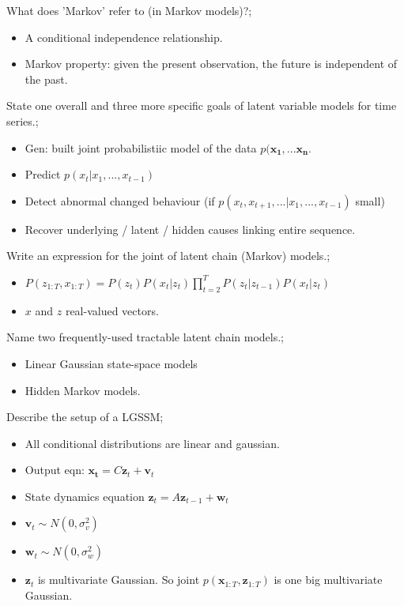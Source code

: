 \documentclass{article}
\begin{document}
What does 'Markov' refer to (in Markov models)?; \begin{itemize} \item A conditional independence relationship.  \item Markov property: given the present observation, the future is independent of the past.  \end{itemize}

State one overall and three more specific goals of latent variable models for time series.; \begin{itemize} \item Gen: built joint probabilistiic model of the data $p(\mathbf{x_1,...x_n}$.  \item Predict $p(x_t|x_1,...,x_{t-1})$ \item Detect abnormal changed behaviour (if $p(x_t, x_{t+1}, ...|x_1,...,x_{t-1})$ small) \item Recover underlying / latent / hidden causes linking entire sequence.  \end{itemize}

Write an expression for the joint of latent chain (Markov) models.; \begin{itemize} \item $P(z_{1:T}, x_{1:T}) = P(z_t)P(x_t|z_t)\prod_{t=2}^TP(z_t|z_{t-1})P(x_t|z_t)$ \item $x$ and $z$ real-valued vectors.  \end{itemize} 

Name two frequently-used tractable latent chain models.; \begin{itemize} \item Linear Gaussian state-space models \item Hidden Markov models.  \end{itemize}

Describe the setup of a LGSSM; \begin{itemize} \item All conditional distributions are linear and gaussian.  \item Output eqn: $\mathbf{x_t}=C\mathbf{z}_t+\mathbf{v}_t$ \item State dynamics equation $\mathbf{z}_t=A\mathbf{z}_{t-1}+\mathbf{w}_t$ \item $\mathbf{v}_t \sim N(0,\sigma^2_v)$ \item $\mathbf{w}_t \sim N(0,\sigma^2_w)$ \item $\mathbf{z}_t$ is multivariate Gaussian. So joint $p(\mathbf{x}_{1:T}, \mathbf{z}_{1:T})$ is one big multivariate Gaussian.  \end{itemize}
\end{document}
